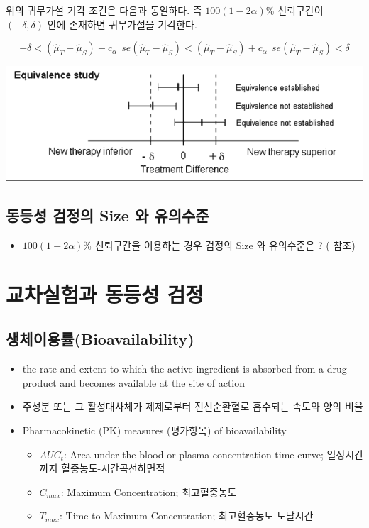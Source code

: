\documentclass[
]{book}
\providecommand{\tightlist}{%
  \setlength{\itemsep}{0pt}\setlength{\parskip}{0pt}}
\begin{document}
위의 귀무가설 기각 조건은 다음과 동일하다. 즉 \(100(1-2\alpha)\)\% 신뢰구간이 \((-\delta, \delta)\) 안에 존재하면 귀무가설을 기각한다.

\[ 
-\delta < (\hat \mu_T - \hat \mu_S) -  c_{\alpha} ~~se(\hat \mu_T - \hat \mu_S) < 
(\hat \mu_T - \hat \mu_S) + c_{\alpha}~~ se(\hat \mu_T - \hat \mu_S) < \delta
\]

\includegraphics{equiv-equiv.png}

\hypertarget{uxb3d9uxb4f1uxc131-uxac80uxc815uxc758-size-uxc640-uxc720uxc758uxc218uxc900}{%
\section{동등성 검정의 Size 와 유의수준}\label{uxb3d9uxb4f1uxc131-uxac80uxc815uxc758-size-uxc640-uxc720uxc758uxc218uxc900}}

\begin{itemize}
\tightlist
\item
  \(100(1-2\alpha)\)\% 신뢰구간을 이용하는 경우 검정의 Size 와 유의수준은 ? ( \citet{kang2008} 참조)
\end{itemize}

\hypertarget{cross}{%
\chapter{교차실험과 동등성 검정}\label{cross}}

\hypertarget{uxc0dduxccb4uxc774uxc6a9uxb960bioavailability}{%
\section{생체이용률(Bioavailability)}\label{uxc0dduxccb4uxc774uxc6a9uxb960bioavailability}}

\begin{itemize}
\item
  the rate and extent to which the active ingredient is absorbed from a drug product and becomes available at the site of action
\item
  주성분 또는 그 활성대사체가 제제로부터 전신순환혈로 흡수되는 속도와 양의 비율
\item
  Pharmacokinetic (PK) measures (평가항목) of bioavailability

  \begin{itemize}
  \tightlist
  \item
    \(AUC_t\): Area under the blood or plasma concentration-time curve; 일정시간까지 혈중농도-시간곡선하면적
  \item
    \(C_{max}\): Maximum Concentration; 최고혈중농도
  \item
    \(T_{max}\): Time to Maximum Concentration; 최고혈중농도 도달시간
  \end{itemize}
\end{itemize}
\end{document}
